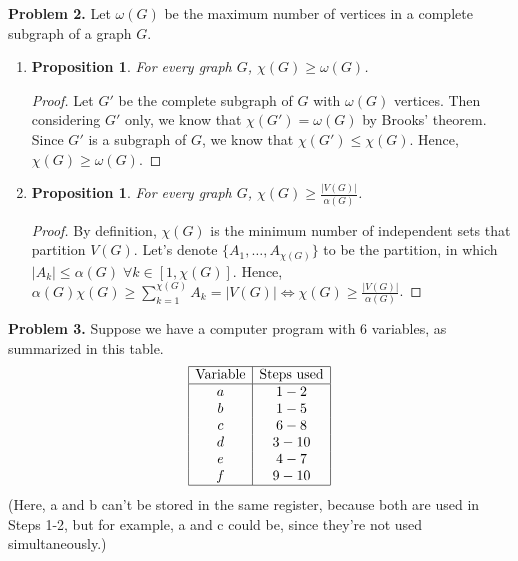 \documentclass{article}
\newtheorem{prop}[thm]{Proposition}
\begin{document}
\textbf{Problem 2.}
Let $\omega(G)$ be the maximum number of vertices in a complete subgraph of a graph $G$.
\begin{enumerate}[label=(\alph*)]
    \item 
    \begin{prop}
        For every graph $G$, $\chi(G) \ge \omega(G)$.
    \end{prop}
    \begin{proof}
        Let $G'$ be the complete subgraph of $G$ with $\omega(G)$ vertices.
        Then considering $G'$ only, we know that $\chi(G') = \omega(G)$ by Brooks' theorem.
        Since $G'$ is a subgraph of $G$, we know that $\chi(G') \le \chi(G)$.
        Hence, $\chi(G) \ge \omega(G)$.
    \end{proof}

    \item
    \begin{prop}
        For every graph $G$, $\chi(G) \ge \frac{|V(G)|}{\alpha(G)}$.
    \end{prop}
    \begin{proof}
        By definition, $\chi(G)$ is the minimum number of independent sets that partition $V(G)$. 
        Let's denote $\{A_1, \dots, A_{\chi(G)}\}$ to be the partition, in which $|A_k| \le \alpha(G)\; \forall k \in [1,\chi(G)]$.
        Hence, $\alpha(G)\chi(G) \ge \sum_{k=1}^{\chi(G)}A_k = |V(G)| \Leftrightarrow \chi(G) \ge \frac{|V(G)|}{\alpha(G)}$.
    \end{proof}
\end{enumerate}
\bigbreak

\textbf{Problem 3.}
Suppose we have a computer program with 6 variables, as summarized in this table. 
\begin{displaymath}
    \begin{array}{|c|c|}
        \hline
        \text{Variable} & \text{Steps used} \\
        \hline
        a & 1-2 \\
        b & 1-5 \\
        c & 6-8 \\
        d & 3-10 \\ 
        e & 4-7 \\
        f & 9-10 \\
        \hline
    \end{array}
\end{displaymath}
(Here, a and b can’t be stored in the same register, because both are used in Steps 1-2, but for example, a and c could be, since they’re not used simultaneously.)
\end{document}
